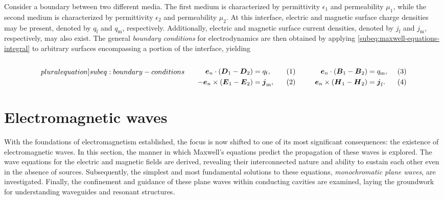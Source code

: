 \documentclass[11pt,a4paper,twoside,openany]{report}
\begin{document}
Consider a boundary between two different media. The first medium is characterized by permittivity $\epsilon_1$ and permeability $\mu_1$, while the second medium is characterized by permittivity $\epsilon_2$ and permeability $\mu_2$. At this interface, electric and magnetic surface charge densities may be present, denoted by $q_{\mathrm f}$ and $q_{\mathrm m}$, respectively. Additionally, electric and magnetic surface current densities, denoted by $j_{\mathrm f}$ and $j_{\mathrm m}$, respectively, may also exist. The general \emph{boundary conditions} for electrodynamics are then obtained by applying \cref{subeq:maxwell-equations-integral} to arbitrary surfaces encompassing a portion of the interface, yielding\\
\begin{subequations}
    \label[pluralequation]{subeq:boundary-conditions}
    \noindent\centering
    \begin{minipage}{0.45\textwidth}
        \begin{align}
            \label{eq:boundary-conditions-d-normal}
            \vec e_n \cdot (\vec D_1 - \vec D_2) &= q_{\mathrm f},
        \\
            \label{eq:boundary-conditions-e-tangential}
            -\vec e_n \times (\vec E_1 - \vec E_2) &= \vec j_{\mathrm m},
        \end{align}
    \end{minipage}
    \hfill
    \begin{minipage}{0.45\textwidth}
        \begin{align}
            \label{eq:boundary-conditions-b-normal}
            \vec e_n \cdot (\vec B_1 - \vec B_2) &= q_{\mathrm m},
        \\
            \label{eq:boundary-conditions-H-tangential}
            \vec e_n \times (\vec H_1 - \vec H_2) &= \vec j_{\mathrm f}.
        \end{align}
    \end{minipage}
    \bigskip
\end{subequations}

\section{Electromagnetic waves}
\label{section:electromagnetic-waves}
With the foundations of electromagnetism established, the focus is now shifted to one of its most significant consequences: the existence of electromagnetic waves. In this section, the manner in which Maxwell's equations predict the propagation of these waves is explored. The wave equations for the electric and magnetic fields are derived, revealing their interconnected nature and ability to sustain each other even in the absence of sources. Subsequently, the simplest and most fundamental solutions to these equations, \emph{monochromatic plane waves}, are investigated. Finally, the confinement and guidance of these plane waves within conducting cavities are examined, laying the groundwork for understanding waveguides and resonant structures.
\end{document}

